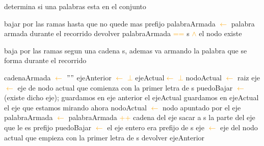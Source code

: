 \begin{algorithm}
\caption{determina si una palabras esta en el conjunto}
\begin{algorithmic}[1]
			\STATE bajar por las ramas hasta que no quede mas prefijo
			\STATE palabraArmada \textcolor{orange}{$\leftarrow$} palabra armada durante el recorrido
			\STATE devolver palabraArmada \textcolor{orange}{==} s \textcolor{orange}{$\wedge$} el nodo existe
\end{algorithmic}
\end{algorithm}		

\begin{algorithm}
\caption{baja por las ramas segun una cadena s, ademas va armando la palabra que se forma durante el recorrido }
\begin{algorithmic}[1]
\STATE cadenaArmada \textcolor{orange}{$\leftarrow$}  $""$
\STATE ejeAnterior \textcolor{orange}{$\leftarrow$}  \textcolor{orange}{$\bot$}
\STATE ejeActual\textcolor{orange}{$\leftarrow$}  \textcolor{orange}{$\bot$}
\STATE nodoActual \textcolor{orange}{$\leftarrow$} raiz
\STATE eje \textcolor{orange}{$\leftarrow$} eje de nodo actual que comienza con la primer letra de s
\STATE puedoBajar \textcolor{orange}{$\leftarrow$} (existe dicho eje);
	\STATE guardamos en eje anterior el ejeActual
	\STATE guardamos en ejeActual el eje que estamos mirando ahora 
	\STATE nodoActual \textcolor{orange}{$\leftarrow$} nodo apuntado por el eje
	\STATE palabraArmada \textcolor{orange}{$\leftarrow$} palabraArmada \textcolor{orange}{++} cadena del eje
	\STATE sacar a s la parte del eje que le es prefijo
	\STATE puedoBajar \textcolor{orange}{$\leftarrow$} el eje entero era prefijo de s
	\STATE eje \textcolor{orange}{$\leftarrow$} eje del nodo actual que empieza con la primer letra de s
\ENDWHILE
\STATE devolver ejeAnterior
\end{algorithmic}
\end{algorithm}	




